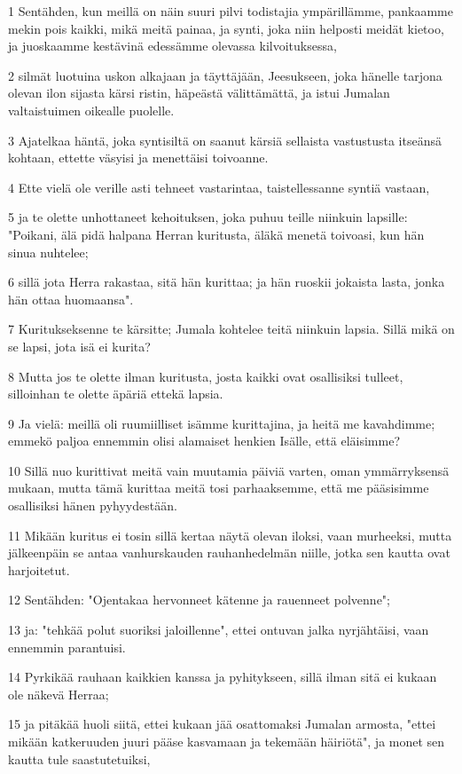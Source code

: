 \par 1 Sentähden, kun meillä on näin suuri pilvi todistajia ympärillämme, pankaamme mekin pois kaikki, mikä meitä painaa, ja synti, joka niin helposti meidät kietoo, ja juoskaamme kestävinä edessämme olevassa kilvoituksessa,
\par 2 silmät luotuina uskon alkajaan ja täyttäjään, Jeesukseen, joka hänelle tarjona olevan ilon sijasta kärsi ristin, häpeästä välittämättä, ja istui Jumalan valtaistuimen oikealle puolelle.
\par 3 Ajatelkaa häntä, joka syntisiltä on saanut kärsiä sellaista vastustusta itseänsä kohtaan, ettette väsyisi ja menettäisi toivoanne.
\par 4 Ette vielä ole verille asti tehneet vastarintaa, taistellessanne syntiä vastaan,
\par 5 ja te olette unhottaneet kehoituksen, joka puhuu teille niinkuin lapsille: "Poikani, älä pidä halpana Herran kuritusta, äläkä menetä toivoasi, kun hän sinua nuhtelee;
\par 6 sillä jota Herra rakastaa, sitä hän kurittaa; ja hän ruoskii jokaista lasta, jonka hän ottaa huomaansa".
\par 7 Kuritukseksenne te kärsitte; Jumala kohtelee teitä niinkuin lapsia. Sillä mikä on se lapsi, jota isä ei kurita?
\par 8 Mutta jos te olette ilman kuritusta, josta kaikki ovat osallisiksi tulleet, silloinhan te olette äpäriä ettekä lapsia.
\par 9 Ja vielä: meillä oli ruumiilliset isämme kurittajina, ja heitä me kavahdimme; emmekö paljoa ennemmin olisi alamaiset henkien Isälle, että eläisimme?
\par 10 Sillä nuo kurittivat meitä vain muutamia päiviä varten, oman ymmärryksensä mukaan, mutta tämä kurittaa meitä tosi parhaaksemme, että me pääsisimme osallisiksi hänen pyhyydestään.
\par 11 Mikään kuritus ei tosin sillä kertaa näytä olevan iloksi, vaan murheeksi, mutta jälkeenpäin se antaa vanhurskauden rauhanhedelmän niille, jotka sen kautta ovat harjoitetut.
\par 12 Sentähden: "Ojentakaa hervonneet kätenne ja rauenneet polvenne";
\par 13 ja: "tehkää polut suoriksi jaloillenne", ettei ontuvan jalka nyrjähtäisi, vaan ennemmin parantuisi.
\par 14 Pyrkikää rauhaan kaikkien kanssa ja pyhitykseen, sillä ilman sitä ei kukaan ole näkevä Herraa;
\par 15 ja pitäkää huoli siitä, ettei kukaan jää osattomaksi Jumalan armosta, "ettei mikään katkeruuden juuri pääse kasvamaan ja tekemään häiriötä", ja monet sen kautta tule saastutetuiksi,
